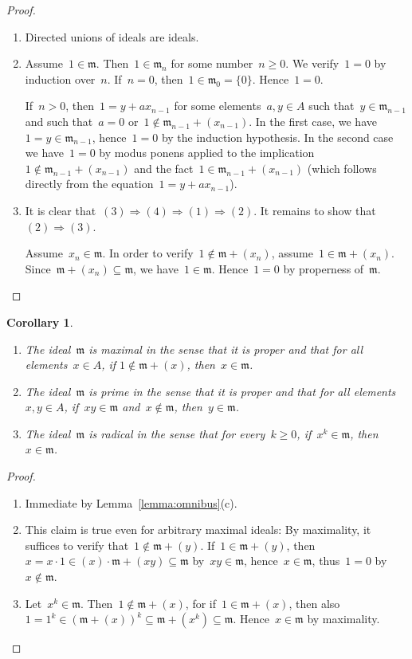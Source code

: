 \documentclass[com,11pt,crcready]{iosart2x}
\theoremstyle{definition}
\theoremstyle{plain}
\newtheorem{corollary}[definition]{Corollary}
\theoremstyle{remark}
\newcommand{\mmm}{\mathfrak{m}}
\renewcommand{\_}{\mathpunct{.}\,}
\begin{document}
\begin{proof}\begin{enumerate}
\item[(a)] Directed unions of ideals are ideals.
\item[(b)] Assume~$1 \in \mmm$. Then~$1 \in \mmm_n$ for some number~$n \geq 0$. We
verify~$1 = 0$ by induction over~$n$.
If~$n = 0$, then~$1 \in \mmm_0 = \{0\}$. Hence~$1 = 0$.

If~$n > 0$, then~$1 = y + a x_{n-1}$ for some elements~$a,y \in A$ such that~$y
\in \mmm_{n-1}$ and such that~$a = 0$ or~$1 \not\in \mmm_{n-1} + (x_{n-1})$.
In the first case, we have~$1 = y \in \mmm_{n-1}$, hence~$1 = 0$ by the induction
hypothesis. In the second case we have~$1 = 0$ by modus ponens applied to the
implication~$1 \not\in \mmm_{n-1} + (x_{n-1})$ and the fact~$1 \in \mmm_{n-1} +
(x_{n-1})$ (which follows directly from the equation~$1 = y + a x_{n-1}$).
\item[(c)] It is clear that~$(3) \Rightarrow (4) \Rightarrow (1) \Rightarrow
(2)$. It remains to show that~$(2) \Rightarrow (3)$.

Assume~$x_n \in \mmm$. In order to verify~$1 \not\in \mmm + (x_n)$,
assume~$1 \in \mmm + (x_n)$. Since~$\mmm + (x_n) \subseteq \mmm$,
we have~$1 \in \mmm$. Hence~$1 = 0$ by properness of~$\mmm$.\qedhere
\end{enumerate}\end{proof}

\begin{corollary}\label{cor:is-prime-max}
\begin{enumerate}
\item[\textnormal{(a)}] The ideal~$\mmm$ is \emph{maximal} in the sense that it is proper and that for
all elements~$x \in A$, if $1 \not\in \mmm + (x)$, then~$x \in \mmm$.
\item[\textnormal{(b)}] The ideal~$\mmm$ is \emph{prime} in the
sense that it is proper and that for
all elements~$x,y \in A$, if~$xy \in \mmm$ and~$x \not\in \mmm$, then~$y \in
\mmm$.
\item[\textnormal{(c)}] The ideal~$\mmm$ is \emph{radical} in the sense that for every~$k \geq 0$, if~$x^k \in
\mmm$, then~$x \in \mmm$.
\end{enumerate}
\end{corollary}

\begin{proof}\begin{enumerate}
\item[(a)] Immediate by Lemma~\ref{lemma:omnibus}(c).
\item[(b)] This claim is true even for arbitrary maximal ideals: By maximality, it suffices to verify that~$1 \not\in
\mmm + (y)$. If~$1 \in \mmm + (y)$, then~$x = x\cdot1 \in (x) \cdot \mmm + (xy)
\subseteq \mmm$ by~$xy \in \mmm$, hence~$x \in \mmm$, thus~$1 = 0$ by~$x \not\in
\mmm$.
\item[(c)] Let~$x^k \in \mmm$. Then~$1 \not\in \mmm + (x)$, for if~$1 \in
\mmm + (x)$, then also~$1 = 1^k \in (\mmm + (x))^k \subseteq \mmm + (x^k)
\subseteq \mmm$. Hence~$x \in \mmm$ by maximality.\qedhere
\end{enumerate}
\end{proof}
\end{document}
